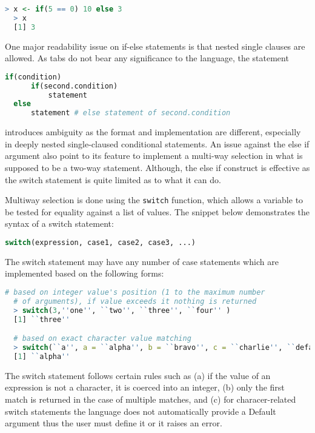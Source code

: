 \documentclass[12pt]{article}
\begin{document}
\begin{lstlisting}[language=R ]
  > x <- if(5 == 0) 10 else 3
  > x
  [1] 3
\end{lstlisting}

One major readability issue on if-else statements is that nested single clauses are allowed. As tabs do not bear any significance to the language, the statement

\begin{lstlisting}[language=R ]
  if(condition)
      if(second.condition)
          statement
  else
      statement # else statement of second.condition
\end{lstlisting}

introduces ambiguity as the format and implementation are different, especially in deeply nested single-claused conditional statements. An issue against the else if argument also point to its feature to implement a multi-way selection in what is supposed to be a two-way statement. Although, the else if construct is effective as the switch statement is quite limited as to what it can do.

Multiway selection is done using the \texttt{switch} function, which allows a variable to be tested for equality against a list of values. The snippet below demonstrates the syntax of a switch statement:

\begin{lstlisting}[language=R ]
  switch(expression, case1, case2, case3, ...)
\end{lstlisting}

 The switch statement may have any number of case statements which are implemented based on the following forms:

\begin{lstlisting}[language=R ]
  # based on integer value's position (1 to the maximum number
  # of arguments), if value exceeds it nothing is returned
  > switch(3,''one'', ``two'', ``three'', ``four'' )
  [1] ``three''

  # based on exact character value matching
  > switch(``a'', a = ``alpha'', b = ``bravo'', c = ``charlie'', ``default value'')
  [1] ``alpha''
\end{lstlisting}

The switch statement follows certain rules such as (a) if the value of an expression is not a character, it is coerced into an integer, (b) only the first match is returned in the case of multiple matches, and (c) for characer-related switch statements the language does not automatically provide a Default argument thus the user must define it or it raises an error.
\end{document}

